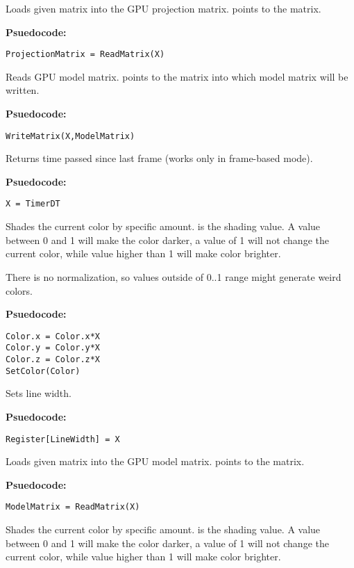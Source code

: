 %


Loads given matrix into the GPU projection matrix.  points to the matrix.

\textbf{Psuedocode:}
\begin{verbatim}
ProjectionMatrix = ReadMatrix(X)
\end{verbatim}


Reads GPU model matrix.  points to the matrix into which model matrix will be written.

\textbf{Psuedocode:}
\begin{verbatim}
WriteMatrix(X,ModelMatrix)
\end{verbatim}


Returns time passed since last frame (works only in frame-based mode).

\textbf{Psuedocode:}
\begin{verbatim}
X = TimerDT
\end{verbatim}


Shades the current color by specific amount.  is the shading value. A value between 0 and 1 will make the color darker, a value of 1 will not change the current color, while value higher than 1 will make color brighter.

There is no normalization, so values outside of 0..1 range might generate weird colors.

\textbf{Psuedocode:}
\begin{verbatim}
Color.x = Color.x*X
Color.y = Color.y*X
Color.z = Color.z*X
SetColor(Color)
\end{verbatim}


Sets line width.

\textbf{Psuedocode:}
\begin{verbatim}
Register[LineWidth] = X
\end{verbatim}


Loads given matrix into the GPU model matrix.  points to the matrix.

\textbf{Psuedocode:}
\begin{verbatim}
ModelMatrix = ReadMatrix(X)
\end{verbatim}


Shades the current color by specific amount.  is the shading value. A value between 0 and 1 will make the color darker, a value of 1 will not change the current color, while value higher than 1 will make color brighter.

